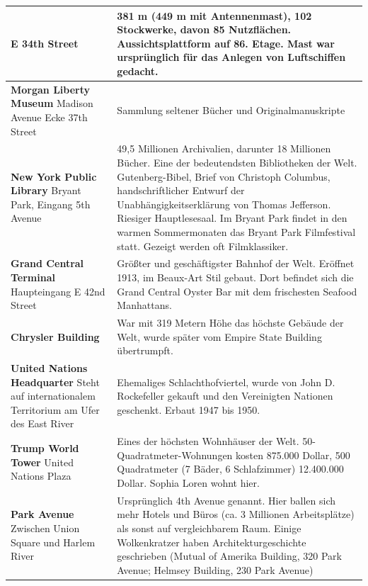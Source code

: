 \documentclass[fontsize=14pt,a4paper,headinclude,DIV=calc,automark]{scrbook}
\begin{document}
{\begin{longtable}{
    >{\raggedright\arraybackslash\columncolor{tablecellblue}}p{5.1cm}
    >{\raggedright\arraybackslash\columncolor{rightcolumn}}p{10cm}
    }
    E 34th Street & 381 m (449 m mit Antennenmast), 102 Stockwerke, davon 85 Nutzflächen. Aussichtsplattform auf 86. Etage. Mast war ursprünglich für das Anlegen von Luftschiffen gedacht. \\ \midrule
    \textbf{Morgan Liberty Museum}\newline
    Madison Avenue Ecke 37th Street & Sammlung seltener Bücher und Originalmanuskripte \\ \midrule
    \textbf{New York Public Library}\newline
    Bryant Park, Eingang 5th Avenue & 49,5 Millionen Archivalien, darunter 18 Millionen Bücher. Eine der bedeutendsten Bibliotheken der Welt. Gutenberg-Bibel, Brief von Christoph Columbus, handschriftlicher Entwurf der Unabhängigkeitserklärung von Thomas Jefferson. Riesiger Hauptlesesaal.\newline
    Im Bryant Park findet in den warmen Sommermonaten das Bryant Park Filmfestival statt. Gezeigt werden oft Filmklassiker. \\ \midrule
    \textbf{Grand Central Terminal}\newline
    Haupteingang E 42nd Street & Größter und geschäftigster Bahnhof der Welt. Eröffnet 1913, im Beaux-Art Stil gebaut. Dort befindet sich die Grand Central Oyster Bar mit dem frischesten Seafood Manhattans. \\ \midrule
    \textbf{Chrysler Building}\newline
     & War mit 319 Metern Höhe das höchste Gebäude der Welt, wurde später vom Empire State Building übertrumpft. \\ \midrule
    \textbf{United Nations Headquarter}\newline
    Steht auf internationalem Territorium am Ufer des East River & Ehemaliges Schlachthofviertel, wurde von John D. Rockefeller gekauft und den Vereinigten Nationen geschenkt. Erbaut 1947 bis 1950. \\ \midrule
    \textbf{Trump World Tower}\newline
    United Nations Plaza & Eines der höchsten Wohnhäuser der Welt. 50-Quadratmeter-Wohnungen kosten 875.000 Dollar, 500 Quadratmeter (7 Bäder, 6 Schlafzimmer) 12.400.000 Dollar. Sophia Loren wohnt hier. \\ \midrule
    \textbf{Park Avenue}\newline
    Zwischen Union Square und Harlem River & Ursprünglich 4th Avenue genannt. Hier ballen sich mehr Hotels und Büros (ca. 3 Millionen Arbeitsplätze) als sonst auf vergleichbarem Raum. Einige Wolkenkratzer haben Architekturgeschichte geschrieben (Mutual of Amerika Building, 320 Park Avenue; Helmsey Building, 230 Park Avenue) \\ \midrule

\end{longtable}}
\end{document}
